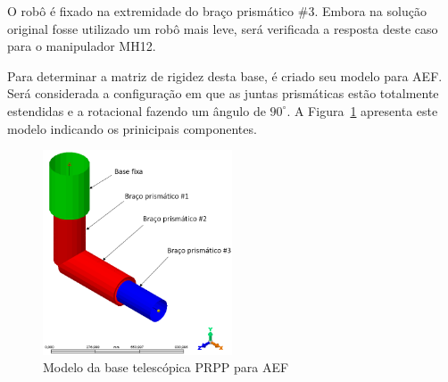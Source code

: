 O robô é fixado na extremidade do braço prismático \#3. Embora na solução
original fosse utilizado um robô mais leve, será verificada a resposta
deste caso para o manipulador MH12.

Para determinar a matriz de rigidez desta base, é criado seu modelo para AEF.
Será considerada a configuração em que as juntas prismáticas estão totalmente
estendidas e a rotacional fazendo um ângulo de $90^\circ$. A
Figura~\ref{fig::base_telesc_fea} apresenta este modelo indicando os prinicipais
componentes.

\begin{figure}[h]
	\centering 
 	\includegraphics[width=0.50\textwidth]{figs/base_telesc_fea}
 	\caption{Modelo da base telescópica PRPP para AEF}
 	\label{fig::base_telesc_fea}
\end{figure}

